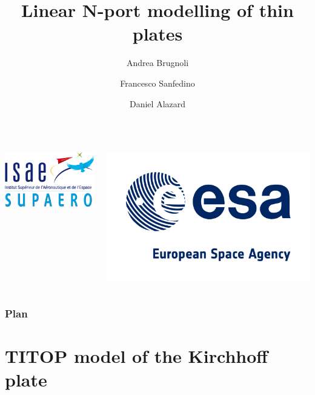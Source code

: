 \documentclass{beamer}
\title[STDplus meeting]{Linear N-port modelling of thin plates}
\author[A. Brugnoli ISAE-SUPAERO ]{\small Andrea Brugnoli \and Francesco Sanfedino \and Daniel Alazard}
\begin{document}
	
\begin{frame}
	\titlepage
\begin{columns}
	\begin{column}{0.5\textwidth}
		\centering
		\includegraphics[height=0.2\textheight]{ISAE-SUPAERO.PNG}
	\end{column}
	\begin{column}{0.5\textwidth}
		\centering
		\includegraphics[height=0.2\textheight]{esa_logo.png}
	\end{column}
\end{columns}

\end{frame}

\begin{frame}
\frametitle{Plan}
\small
\tableofcontents
\normalsize
\end{frame}

\section{TITOP model of the Kirchhoff plate }
\end{document}
